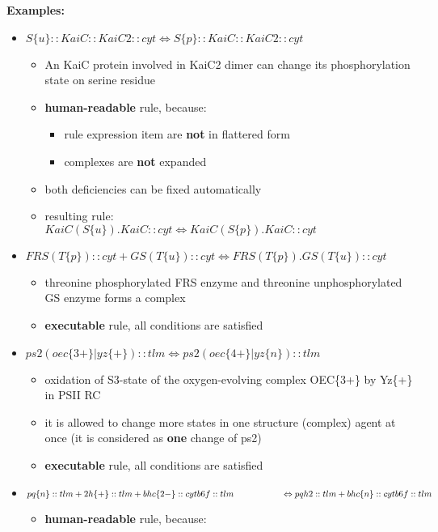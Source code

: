 \documentclass[12pt]{article}
\newcommand{\mysmallsection}[1]{\vspace{0.5cm}\large\textbf{#1}\normalsize\vspace{0.5cm}}
\begin{document}
\mysmallsection{Examples:}
\begin{itemize}
\item $S\{u\}::KaiC::KaiC2::cyt \Leftrightarrow S\{p\}::KaiC::KaiC2::cyt$
	\begin{itemize}
		\item An KaiC protein involved in KaiC2 dimer can change its phosphorylation state on serine residue
		\item \textbf{human-readable} rule, because:
			\begin{itemize}
				\item rule expression item are \textbf{not} in flattered form
				\item complexes are \textbf{not} expanded
			\end{itemize}
		\item both deficiencies can be fixed automatically
		\item resulting rule:\\
	$KaiC(S\{u\}).KaiC::cyt \Leftrightarrow KaiC(S\{p\}).KaiC::cyt$
	\end{itemize}
\item $FRS(T\{p\})::cyt + GS(T\{u\})::cyt \Leftrightarrow FRS(T\{p\}).GS(T\{u\})::cyt$
	\begin{itemize}
		\item threonine phosphorylated FRS enzyme and threonine unphosphorylated GS enzyme forms a complex
		\item \textbf{executable} rule, all conditions are satisfied
	\end{itemize}
\item $ps2(oec\{3+\}|yz\{+\})::tlm \Leftrightarrow ps2(oec\{4+\}|yz\{n\})::tlm$
	\begin{itemize}
		\item oxidation of S3-state of the oxygen-evolving complex OEC\{3+\} by Yz\{+\} in PSII RC
		\item it is allowed to change more states in one structure (complex) agent at once (it is considered as \textbf{one} change of ps2)
		\item \textbf{executable} rule, all conditions are satisfied
	\end{itemize}
\item {\small $pq\{n\}::tlm + 2 h\{+\}::tlm + bhc\{2-\}::cytb6f::tlm \\ \hspace*{1.9cm} \Leftrightarrow pqh2::tlm + bhc\{n\}::cytb6f::tlm$}
	\begin{itemize}
		\item \textbf{human-readable} rule, because:

\end{itemize}
\end{itemize}
\end{document}

